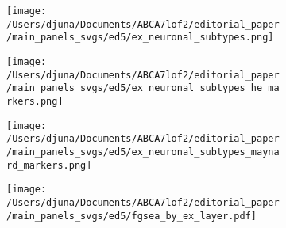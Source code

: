 \documentclass[12pt]{article}
\begin{document}
\begin{figure}[H]
    \begin{subfigure}[t]{.3\textwidth}
        \caption{}
        \texttt{[image: /Users/djuna/Documents/ABCA7lof2/editorial\_paper/main\_panels\_svgs/ed5/ex\_neuronal\_subtypes.png]}        
    \end{subfigure}
    \begin{subfigure}[t]{.3\textwidth}
        \caption{}
        \texttt{[image: /Users/djuna/Documents/ABCA7lof2/editorial\_paper/main\_panels\_svgs/ed5/ex\_neuronal\_subtypes\_he\_markers.png]}        
    \end{subfigure}
    \begin{subfigure}[t]{.3\textwidth}
        \caption{}
        \texttt{[image: /Users/djuna/Documents/ABCA7lof2/editorial\_paper/main\_panels\_svgs/ed5/ex\_neuronal\_subtypes\_maynard\_markers.png]}        
    \end{subfigure}
    \begin{subfigure}[t]{0.8\textwidth}
        \caption{}
        \texttt{[image: /Users/djuna/Documents/ABCA7lof2/editorial\_paper/main\_panels\_svgs/ed5/fgsea\_by\_ex\_layer.pdf]}        
    \end{subfigure}
\end{figure}
\end{document}
